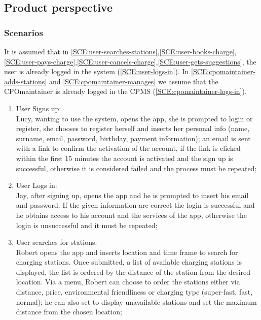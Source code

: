 \subsection{Product perspective}

\subsubsection{Scenarios}
It is assumed that in \ref{SCE:user-searches-stations},\ref{SCE:user-books-charge},\ref{SCE:user-pays-charge},\ref{SCE:user-cancels-charge},\ref{SCE:user-gets-suggestions}, the user is already logged in the system (\ref{SCE:user-logs-in}). In \ref{SCE:cpomaintainer-adds-stations} and \ref{SCE:cpomaintainer-manages} we assume that the \ac{CPO}maintainer is already logged in the \ac{CPMS} (\ref{SCE:cpomaintainer-logs-in}).
\begin{enumerate}[label=\textbf{S\arabic*}]
      \item User Signs up:\\
            Lucy, wanting to use the system, opens the app, she is prompted to login or register,
            she chooses to register herself and inserts her personal info (name, surname, email, password, birthday, payment information);
            an email is sent with a link to confirm the activation of the account, if the link is clicked within
            the first 15 minutes the account is activated and the sign up is successful,
            otherwise it is considered failed and the process must be repeated;\label{SCE:user-signs-up}
      \item User Logs in:\\
            Jay, after signing up, opens the app and he is prompted to insert his email and password.
            If the given information are correct the login is successful and he obtains access to his account
            and the services of the app, otherwise the login is unsuccessful and it must be repeated;\label{SCE:user-logs-in}
      \item User searches for stations:\\
            Robert opens the app and inserts location and time frame to search for charging stations.
            Once submitted, a list of available charging stations is displayed, the list is ordered by the distance of the station
            from the desired location. Via a menu, Robert can choose to order the stations either via distance, price, environmental friendliness or charging type (super-fast, fast, normal); he can also set to display unavailable stations and set the maximum distance from the chosen location;\label{SCE:user-searches-stations}

\end{enumerate}
